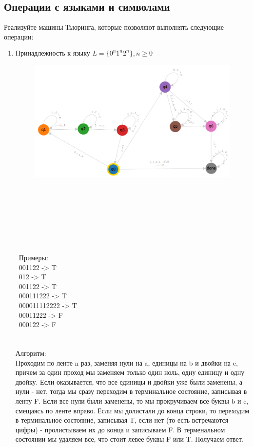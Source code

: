 \documentclass{article}
\begin{document}
\subsection{Операции с языками и символами}

Реализуйте машины Тьюринга, которые позволяют выполнять следующие операции:
\begin{enumerate}
    \item Принадлежность к языку $L = \{ 0^n1^n2^n \}, n \ge 0$
    \begin{figure}[h]
        \centering
        \includegraphics[width=16cm]{pictures/2.1.png}
    \end{figure}
    \\ \\ \\ \\ \\ \\ \\ 
\ Примеры:\\
\ 001122 -> T \\
\ 012 -> T \\
\ 001122 -> T \\
\ 000111222 -> T \\
\ 000011112222 -> T\\
\ 00011222 -> F\\
\ 000122 -> F\\
\\ \\
Алгоритм:\\
Проходим по ленте n раз, заменяя нули на a, единицы на b и двойки на c, причем за один проход мы заменяем только один ноль, одну единицу и одну двойку. Если оказывается, что все единицы и двойки уже были заменены, а нули - нет, тогда мы сразу переходим в терминальное состояние, записывая в ленту F. Если все нули были заменены, то мы прокручиваем все буквы b и c, смещаясь по ленте вправо. Если мы долистали до конца строки, то переходим в терминальное состояние, записывая T, если нет (то есть встречаются цифры) - пролистываем их до конца и записываем F. В терменальном состоянии мы удаляем все, что стоит левее буквы F или T. Получаем ответ.

\end{enumerate}
\end{document}
